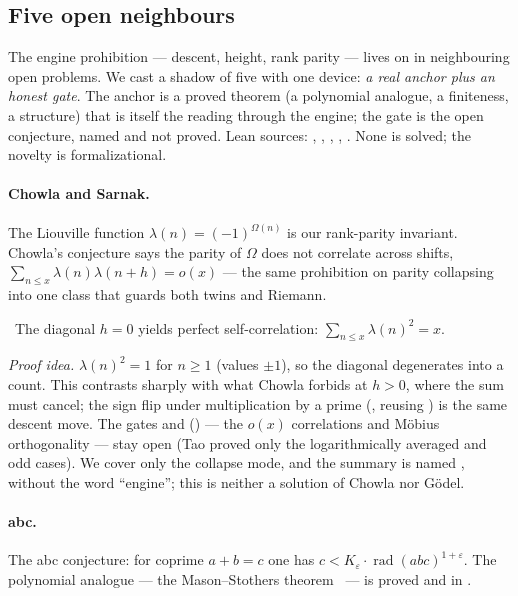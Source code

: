 \subsection{Five open neighbours}

The engine prohibition --- descent, height, rank parity --- lives on in neighbouring open problems.
We cast a shadow of five with one device: \emph{a real  anchor plus an honest gate}.
The anchor is a proved theorem (a polynomial analogue, a finiteness, a structure) that is itself the
reading through the engine; the gate is the open conjecture, named and not proved. Lean sources:
, , , ,
. None is solved; the novelty is formalizational.

\paragraph{Chowla and Sarnak.}
The Liouville function $\lambda(n)=(-1)^{\Omega(n)}$ is our rank-parity invariant. Chowla's
conjecture says the parity of $\Omega$ does not correlate across shifts,
$\sum_{n\le x}\lambda(n)\lambda(n+h)=o(x)$ --- the same prohibition on parity collapsing into one
class that guards both twins and Riemann.

\begin{theorem}\label{thm:chowlaCorrelation_zero_eq_card}
\green{}\ The diagonal $h=0$ yields perfect self-correlation:
$\sum_{n\le x}\lambda(n)^2=x$. 
\end{theorem}

\emph{Proof idea.} $\lambda(n)^2=1$ for $n\ge 1$ (values $\pm1$), so the diagonal degenerates into a
count. This contrasts sharply with what Chowla forbids at $h>0$, where the sum must cancel; the sign
flip under multiplication by a prime (, reusing )
is the same descent move. The gates  and  (\red{}) ---
the $o(x)$ correlations and Möbius orthogonality --- stay open (Tao proved only the logarithmically
averaged and odd cases). We cover only the collapse mode, and the summary is named
, without the word ``engine''; this is neither a solution of
Chowla nor Gödel.

\paragraph{abc.}
The abc conjecture: for coprime $a+b=c$ one has $c<K_\varepsilon\cdot\operatorname{rad}(abc)^{1+\varepsilon}$.
The polynomial analogue --- the Mason–Stothers theorem~\cite{mason1984,stothers1981} --- is proved
and in .

